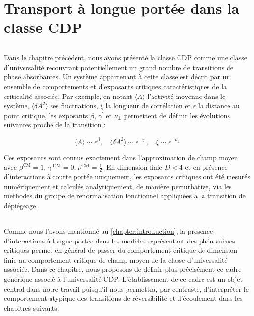 \chapter{Transport à longue portée dans la classe CDP}

\label{chapter:TransportLP}

\subparagraph{}Dans le chapitre précédent, nous avons présenté la classe CDP comme une classe d'universalité recouvrant potentiellement un grand nombre de transitions de phase absorbantes. Un système appartenant à cette classe est décrit par un ensemble de comportements et d'exposants critiques caractéristiques de la criticalité associée. Par exemple, en notant $\langle A \rangle$ l'activité moyenne dans le système, $\langle \delta A^2 \rangle$ ses fluctuations, $\xi$ la longueur de corrélation et $\epsilon$ la distance au point critique, les exposants $\beta$, $\gamma^\prime$ et $\nu_\perp$ permettent de définir les évolutions suivantes proche de la transition :

\begin{equation}
	\langle A \rangle \sim \epsilon^\beta, \quad \langle \delta A^2 \rangle \sim \epsilon^{-\gamma^\prime}, \quad \xi \sim \epsilon^{-\nu_\perp}
\end{equation}

\noindent Ces exposants sont connus exactement dans l'approximation de champ moyen avec $\beta^\text{CM} = 1$, $\gamma^{\prime\text{CM}} = 0$, $\nu_\perp^\text{CM} = \frac{1}{2}$. En dimension finie $D<4$ et en présence d'interactions à courte portée uniquement, les exposants critiques ont été mesurés numériquement \cite{lubeck_universal_2004} et calculés analytiquement, de manière perturbative, via les méthodes du groupe de renormalisation fonctionnel appliquées à la transition de dépiégeage.

\subparagraph{}Comme nous l'avons mentionné au \autoref{chapter:introduction}, la présence d'interactions à longue portée dans les modèles représentant des phénomènes critiques permet en général de passer du comportement critique de dimension finie au comportement critique de champ moyen de la classe d'universalité associée. Dans ce chapitre, nous proposons de définir plus précisément ce cadre générique associé à l'universalité CDP. L'établissement de ce cadre est un objet central dans notre travail puisqu'il nous permettra, par contraste, d'interpréter le comportement atypique des transitions de réversibilité et d'écoulement dans les chapitres suivants.


